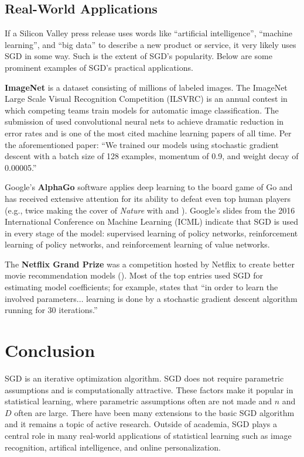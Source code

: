 \documentclass{article}
\begin{document}
\subsection{Real-World Applications}

If a Silicon Valley press release uses words like ``artificial intelligence'',
``machine learning'', and ``big data'' to describe a new product or service, it very likely
uses SGD in some way. Such is the extent of SGD's popularity. 
Below are some prominent examples of SGD's practical
applications.

\textbf{ImageNet} is a dataset consisting of millions
of labeled images. The
		ImageNet Large Scale Visual Recognition Competition (ILSVRC) is
		an annual contest in which competing teams train models for
		automatic image classification. The submission of \cite{krizhevsky2012imagenet} used convolutional neural
		nets to achieve dramatic reduction in error rates and is
		one of the most cited machine learning papers of all time. Per the aforementioned paper: ``We
		trained our models using stochastic gradient descent with a
		batch size of 128 examples, momentum of 0.9, and weight decay of
		0.00005.''

Google's \textbf{AlphaGo} software applies deep learning to the
		board game of Go and has received extensive attention for its
		ability to defeat even top human players (e.g., twice making the
		cover of \textit{Nature} with \cite{silver2016mastering} and
		\cite{silver2017mastering}). Google's slides from the 2016
		International Conference on Machine Learning (ICML) indicate
		that SGD is used in every stage of the
		model: supervised learning of policy networks, reinforcement
		learning of policy networks, and reinforcement learning of value
		networks.

The \textbf{Netflix Grand Prize} was a competition hosted by
		Netflix to create better movie recommendation models
		(\cite{bennett2007netflix}). Most of the top entries used
		SGD for estimating model coefficients; for example,
		\cite{koren2009bellkor} states that ``in order to learn the
		involved parameters$\ldots$ learning is done by a stochastic
		gradient descent algorithm running for 30 iterations.'' 

\section{Conclusion}

SGD is an iterative optimization algorithm. SGD does not require parametric
assumptions and is computationally attractive. These factors make it popular 
in statistical learning, where parametric assumptions often are not made and $n$
and $D$ often are large. There have been many extensions to the basic
SGD algorithm and it remains a topic of active research. Outside of academia,
SGD plays a central role in many real-world applications of statistical learning
such as image recognition, artifical intelligence, and online personalization.

\newpage

\printbibliography[heading=bibnumbered]
\end{document}
